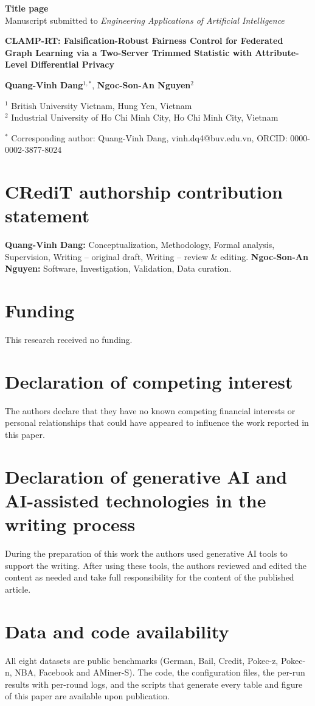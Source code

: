 \documentclass[11pt]{article}
\begin{document}
{\large\bfseries Title page}\\[0.2em]
Manuscript submitted to \emph{Engineering Applications of Artificial Intelligence}

\vspace{0.5em}
{\Large\bfseries CLAMP-RT: Falsification-Robust Fairness Control for Federated Graph Learning via a Two-Server Trimmed Statistic with Attribute-Level Differential Privacy}

\textbf{Quang-Vinh Dang}$^{1,*}$, \textbf{Ngoc-Son-An Nguyen}$^{2}$

$^{1}$ British University Vietnam, Hung Yen, Vietnam\\
$^{2}$ Industrial University of Ho Chi Minh City, Ho Chi Minh City, Vietnam

$^{*}$ Corresponding author: Quang-Vinh Dang, vinh.dq4@buv.edu.vn, ORCID: 0000-0002-3877-8024

\section*{CRediT authorship contribution statement}
\textbf{Quang-Vinh Dang:} Conceptualization, Methodology, Formal analysis, Supervision, Writing -- original draft, Writing -- review \& editing.
\textbf{Ngoc-Son-An Nguyen:} Software, Investigation, Validation, Data curation.

\section*{Funding}
This research received no funding.

\section*{Declaration of competing interest}
The authors declare that they have no known competing financial interests or personal relationships that could have appeared to influence the work reported in this paper.

\section*{Declaration of generative AI and AI-assisted technologies in the writing process}
During the preparation of this work the authors used generative AI tools to support the writing. After using these tools, the authors reviewed and edited the content as needed and take full responsibility for the content of the published article.

\section*{Data and code availability}
All eight datasets are public benchmarks (German, Bail, Credit, Pokec-z, Pokec-n, NBA, Facebook and AMiner-S). The code, the configuration files, the per-run results with per-round logs, and the scripts that generate every table and figure of this paper are available upon publication.
\end{document}
